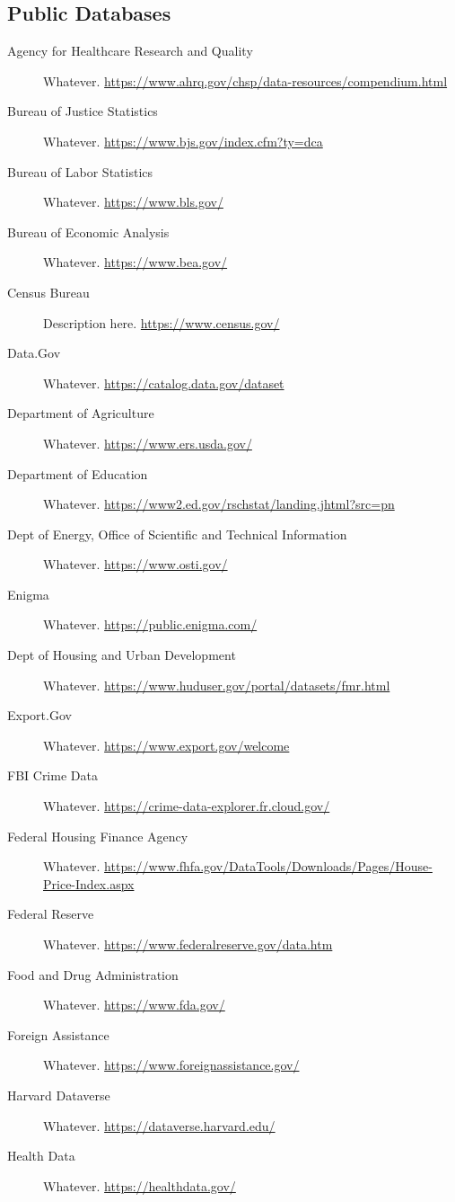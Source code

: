 \subsection{Public Databases}

\begin{description}
	\item[Agency for Healthcare Research and Quality] Whatever. \url{https://www.ahrq.gov/chsp/data-resources/compendium.html}
	\item[Bureau of Justice Statistics] Whatever. \url{https://www.bjs.gov/index.cfm?ty=dca}
	\item[Bureau of Labor Statistics] Whatever. \url{https://www.bls.gov/}
	\item[Bureau of Economic Analysis] Whatever. \url{https://www.bea.gov/}
	\item[Census Bureau] Description here. \url{https://www.census.gov/}
	\item[Data.Gov] Whatever. \url{https://catalog.data.gov/dataset}
	\item[Department of Agriculture] Whatever. \url{https://www.ers.usda.gov/}
	\item[Department of Education] Whatever. \url{https://www2.ed.gov/rschstat/landing.jhtml?src=pn}
	\item[Dept of Energy, Office of Scientific and Technical Information] Whatever. \url{https://www.osti.gov/}	\item[Enigma] Whatever. \url{https://public.enigma.com/}
	\item[Dept of Housing and Urban Development] Whatever. \url{https://www.huduser.gov/portal/datasets/fmr.html}
	\item[Export.Gov] Whatever. \url{https://www.export.gov/welcome}
	\item[FBI Crime Data] Whatever. \url{https://crime-data-explorer.fr.cloud.gov/}
	\item[Federal Housing Finance Agency] Whatever. \url{https://www.fhfa.gov/DataTools/Downloads/Pages/House-Price-Index.aspx}
	\item[Federal Reserve] Whatever. \url{https://www.federalreserve.gov/data.htm}
	\item[Food and Drug Administration] Whatever. \url{https://www.fda.gov/}
	\item[Foreign Assistance] Whatever. \url{https://www.foreignassistance.gov/}
	\item[Harvard Dataverse] Whatever. \url{https://dataverse.harvard.edu/}
	\item[Health Data] Whatever. \url{https://healthdata.gov/}

\end{description}
